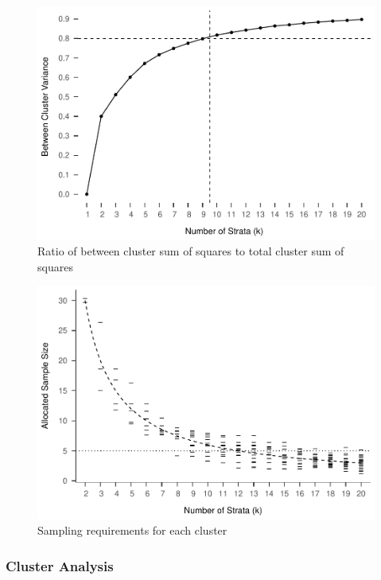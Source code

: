 \documentclass[man,floatsintext]{apa6}
\begin{document}
\begin{figure}
\centering
\includegraphics{GenSamp_Paper_files/figure-latex/fig-ratio-1.pdf}
\caption{\label{fig:fig-ratio}Ratio of between cluster sum of squares to total cluster sum of squares}
\end{figure}

\begin{figure}
\centering
\includegraphics{GenSamp_Paper_files/figure-latex/fig-k-size-1.pdf}
\caption{\label{fig:fig-k-size}Sampling requirements for each cluster}
\end{figure}

\hypertarget{cluster-analysis}{%
\subsubsection{Cluster Analysis}\label{cluster-analysis}}
\end{document}
